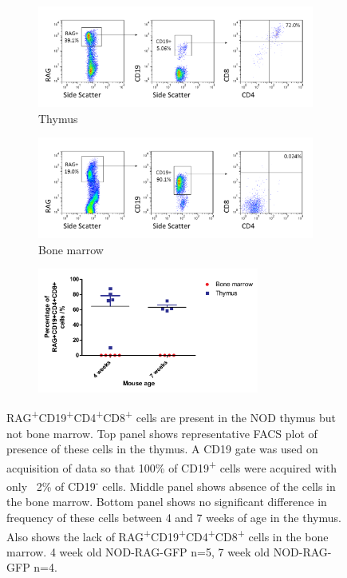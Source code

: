 \begin{figure}	
	\begin{subfigure}{\textwidth}
	\includegraphics[width=\textwidth]{Figures/Thymus1RAGCD19DP.png}
	\caption{Thymus}
	\label{subfig:ThyRAGCD19DP}
	\end{subfigure}
	\begin{subfigure}{\textwidth}
	\includegraphics[width=\textwidth]{Figures/BM1RAGCD19DP.png}
	\caption{Bone marrow}
	\label{subfig:BMRAGCD19DP}
	\end{subfigure}
	\begin{subfigure}{\textwidth}
	\centering
	\includegraphics[width=0.8\textwidth]{Figures/BMvThyDP.pdf}
	\caption{}
	\label{BMvThyDPgraph}
	\end{subfigure}
\caption{RAG\textsuperscript{+}CD19\textsuperscript{+}CD4\textsuperscript{+}CD8\textsuperscript{+} cells are present in the NOD thymus but not bone marrow.
Top panel shows representative FACS plot of presence of these cells in the thymus. A CD19 gate was used on acquisition of data so that 100\% of CD19\textsuperscript{+} cells were acquired with only ~2\% of CD19\textsuperscript{-} cells.
Middle panel shows absence of the cells in the bone marrow.
Bottom panel shows no significant difference in frequency of these cells between 4 and 7 weeks of age in the thymus.
Also shows the lack of RAG\textsuperscript{+}CD19\textsuperscript{+}CD4\textsuperscript{+}CD8\textsuperscript{+} cells in the bone marrow.
4 week old NOD-RAG-GFP n=5, 7 week old NOD-RAG-GFP n=4.}
\label{fig:RAGCD19DP}
\end{figure}


